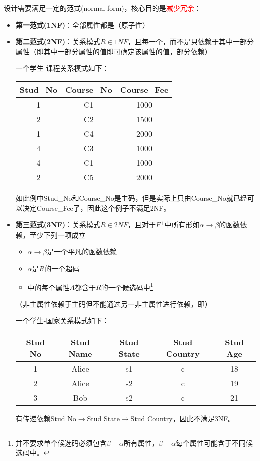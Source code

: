 设计需要满足一定的范式(normal form)，核心目的是\textcolor{red}{减少冗余}：
\begin{itemize}
	\item \textbf{第一范式(1NF)}：全部属性都是（原子性）

	\item \textbf{第二范式(2NF)}：关系模式$R\in 1NF$，且每一个，而不是只依赖于其中一部分属性（即其中一部分属性的值即可确定该属性的值，部分依赖）
	\begin{example}
	一个学生-课程关系模式如下：
	\begin{center}
	\begin{tabular}{|c|c|c|}\hline
		Stud\_No & Course\_No & Course\_Fee\\\hline
		1 & C1 & 1000\\
		2 & C2 & 1500\\
		1 & C4 & 2000\\
		4 & C3 & 1000\\
		4 & C1 & 1000\\
		2 & C5 & 2000\\\hline
	\end{tabular}
	\end{center}
	如此例中Stud\_No和Course\_No是主码，但是实际上只由Course\_No就已经可以决定Course\_Fee了，因此这个例子不满足2NF。
	\end{example}

	\item \textbf{第三范式(3NF)}：关系模式$R\in 2NF$，且对于$F^+$中所有形如$\alpha\to\beta$的函数依赖，至少下列一项成立
	\begin{itemize}
		\item $\alpha\to\beta$是一个平凡的函数依赖
		\item $\alpha$是$R$的一个超码
		\item \textemph{$\beta-\alpha$}中的每个属性$A$都含于$R$的一个候选码中\footnote{并不要求单个候选码必须包含$\beta-\alpha$所有属性，$\beta-\alpha$每个属性可能含于不同候选码中。}
	\end{itemize}
	（非主属性依赖于主码但不能通过另一非主属性进行依赖，即）
	\begin{example}
	一个学生-国家关系模式如下：
	\begin{center}
	\begin{tabular}{ccccc}\hline
	Stud No & Stud Name & Stud State & Stud Country & Stud Age\\\hline
	1 & Alice & s1 & c & 18\\
	2 & Alice & s2 & c & 19\\
	3 & Bob & s2 & c & 21\\\hline
	\end{tabular}
	\end{center}
	有传递依赖Stud No$\to$Stud State$\to$Stud Country，因此不满足3NF。
	\end{example}


\end{itemize}
